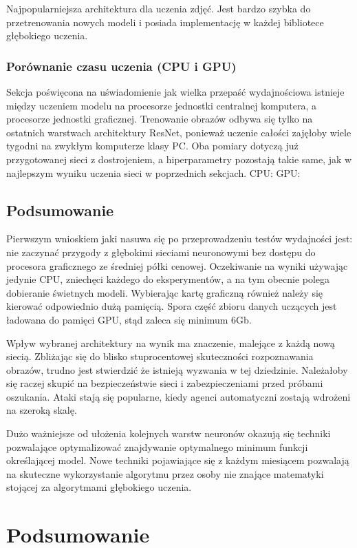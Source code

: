 \documentclass[12pt,a4paper,twoside,titlepage,openright]{book}
\begin{document}
Najpopularniejsza architektura dla uczenia zdjęć. Jest bardzo szybka do przetrenowania nowych modeli i posiada implementację w każdej bibliotece głębokiego uczenia.

\subsection{Porównanie czasu uczenia (CPU i GPU)}
Sekcja poświęcona na uświadomienie jak wielka przepaść wydajnościowa istnieje między uczeniem modelu na procesorze jednostki centralnej komputera, a procesorze jednostki graficznej. Trenowanie obrazów odbywa się tylko na ostatnich warstwach architektury ResNet, ponieważ uczenie całości zajęłoby wiele tygodni na zwykłym komputerze klasy PC.
Oba pomiary dotyczą już przygotowanej sieci z dostrojeniem, a hiperparametry pozostają takie same, jak w najlepszym wyniku uczenia sieci w poprzednich sekcjach.
CPU:
GPU:

\section{Podsumowanie}
Pierwszym wnioskiem jaki nasuwa się po przeprowadzeniu testów wydajności jest: nie zaczynać przygody z głębokimi sieciami neuronowymi bez dostępu do procesora graficznego ze średniej półki cenowej. Oczekiwanie na wyniki używając jedynie CPU, zniechęci każdego do eksperymentów, a na tym obecnie polega dobieranie świetnych modeli. Wybierając kartę graficzną również należy się kierować odpowiednio dużą pamięcią. Spora część zbioru danych uczących jest ładowana do pamięci GPU, stąd zaleca się minimum 6Gb.

Wpływ wybranej architektury na wynik ma znaczenie, malejące z każdą nową siecią. Zbliżając się do blisko stuprocentowej skuteczności rozpoznawania obrazów, trudno jest stwierdzić że istnieją wyzwania w tej dziedzinie. Należałoby się raczej skupić na bezpieczeństwie sieci i zabezpieczeniami przed próbami oszukania. Ataki stają się popularne, kiedy agenci automatyczni zostają wdrożeni na szeroką skalę.

Dużo ważniejsze od ułożenia kolejnych warstw neuronów okazują się techniki pozwalające optymalizować znajdywanie optymalnego minimum funkcji określającej model. Nowe techniki pojawiające się z każdym miesiącem pozwalają na skuteczne wykorzystanie algorytmu przez osoby nie znające matematyki stojącej za algorytmami głębokiego uczenia.


\chapter*{Podsumowanie}


\listoffigures


\printbibliography
\end{document}
